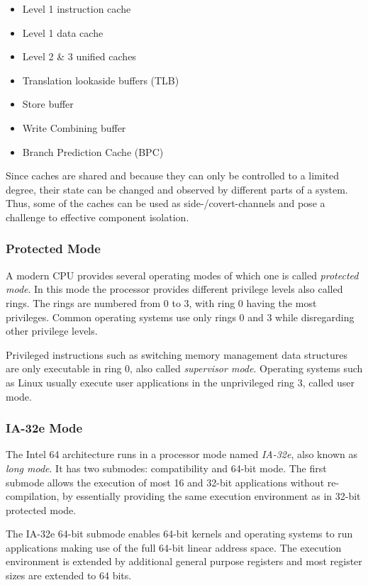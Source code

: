 \begin{itemize}
	\item Level 1 instruction cache
	\item Level 1 data cache
	\item Level 2 \& 3 unified caches
	\item Translation lookaside buffers (TLB)
	\item Store buffer
	\item Write Combining buffer
	\item Branch Prediction Cache (BPC)
\end{itemize}

Since caches are shared and because they can only be controlled to a limited
degree, their state can be changed and observed by different parts of a system.
Thus, some of the caches can be used as side-/covert-channels and pose a
challenge to effective component isolation.

\subsubsection{Protected Mode}
A modern CPU provides several operating modes of which one is called
\emph{protected mode}. In this mode the processor provides different privilege
levels also called rings. The rings are numbered from 0 to 3, with ring 0 having
the most privileges. Common operating systems use only rings 0 and 3 while
disregarding other privilege levels.

Privileged instructions such as switching memory management data structures are
only executable in ring 0, also called \emph{supervisor mode}. Operating systems
such as Linux usually execute user applications in the unprivileged ring 3,
called user mode.

\subsubsection{IA-32e Mode}
The Intel 64 architecture runs in a processor mode named \emph{IA-32e}, also
known as \emph{long mode}. It has two submodes: compatibility and 64-bit mode.
The first submode allows the execution of most 16 and 32-bit applications
without re-compilation, by essentially providing the same execution environment
as in 32-bit protected mode.

The IA-32e 64-bit submode enables 64-bit kernels and operating systems to run
applications making use of the full 64-bit linear address space. The execution
environment is extended by additional general purpose registers and most
register sizes are extended to 64 bits.

